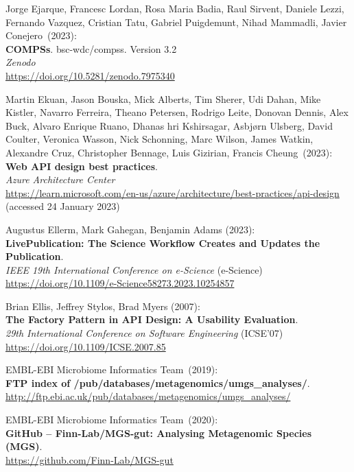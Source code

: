 \begin{thebibliography}{9}
Jorge Ejarque, Francesc Lordan, Rosa Maria Badia, Raul Sirvent, Daniele Lezzi, Fernando Vazquez, Cristian Tatu,  Gabriel Puigdemunt, Nihad Mammadli, Javier Conejero~(2023): \\
\textbf{COMPSs}. bsc-wdc/compss. Version 3.2\\
\emph{Zenodo} \\
\url{https://doi.org/10.5281/zenodo.7975340}

Martin Ekuan, Jason Bouska, Mick Alberts, Tim Sherer, Udi Dahan, Mike Kistler, Navarro Ferreira, Theano Petersen, Rodrigo Leite, Donovan Dennis, Alex Buck, Alvaro Enrique Ruano, Dhanas hri Kshirsagar, Asbjørn Ulsberg, David Coulter, Veronica Wasson, Nick Schonning, Marc Wilson, James Watkin, Alexandre Cruz, Christopher Bennage, Luis Gizirian, Francis Cheung~(2023): \\
\textbf{Web {API} design best practices}.\\
\emph{Azure Architecture Center}\\
\url{https://learn.microsoft.com/en-us/azure/architecture/best-practices/api-design}
(accessed 24 January 2023)

Augustus Ellerm, Mark Gahegan, Benjamin Adams (2023):\\
\textbf{LivePublication: The Science Workflow Creates and Updates the Publication}.\\
\emph{IEEE 19th International Conference on e-Science} (e-Science) \\
\url{https://doi.org/10.1109/e-Science58273.2023.10254857}

Brian Ellis, Jeffrey Stylos, Brad Myers (2007):\\
\textbf{The Factory Pattern in API Design: A Usability Evaluation}.\\
\emph{29th International Conference on Software Engineering} (ICSE'07)\\
\url{https://doi.org/10.1109/ICSE.2007.85}

EMBL-EBI Microbiome Informatics Team~(2019): \\
\textbf{FTP index of /pub/databases/metagenomics/umgs\_analyses/}.\\
\url{http://ftp.ebi.ac.uk/pub/databases/metagenomics/umgs_analyses/}

EMBL-EBI Microbiome Informatics Team~(2020): \\
\textbf{GitHub -- Finn-Lab/MGS-gut: Analysing Metagenomic Species (MGS)}.\\
\url{https://github.com/Finn-Lab/MGS-gut}


\end{thebibliography}
